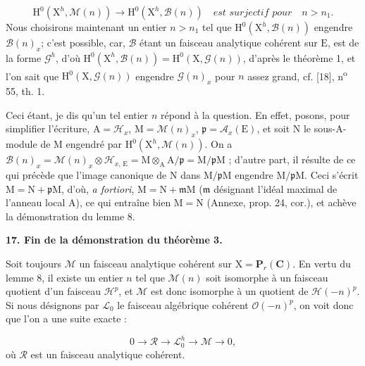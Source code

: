 \begin{equation}\tag{9}
\mathrm{H}^0(\mathrm{X}^h, \mathcal{M}(n)) \to \mathrm{H}^0(\mathrm{X}^h, \mathcal{B}(n)) \quad \textit{est surjectif pour} \quad n > n_1.
\end{equation}
Nous choisirons maintenant un entier $n > n_1$ tel que $\mathrm{H}^0(\mathrm{X}^h, \mathcal{B}(n))$ engendre $\mathcal{B}(n)_x$; c'est possible, car, $\mathcal{B}$ étant un faisceau analytique cohérent sur $\mathrm{E}$, est de la forme $\mathcal{G}^h$, d'où $\mathrm{H}^0(\mathrm{X}^h, \mathcal{B}(n)) = \mathrm{H}^0(\mathrm{X}, \mathcal{G}(n))$, d'après le théorème 1, et l'on sait que $\mathrm{H}^0(\mathrm{X}, \mathcal{G}(n))$ engendre $\mathcal{G}(n)_x$ pour $n$ assez grand, cf. [18], n\textsuperscript{o} 55, th. 1.

Ceci étant, je dis qu'un tel entier $n$ répond à la question.
%
%
En effet, posons, pour simplifier l'écriture, $\mathrm{A} = \mathcal{H}_x$, $\mathrm{M} = \mathcal{M}(n)_x$, $\mathfrak{p} = \mathcal{A}_x(\mathrm{E})$, et soit $\mathrm{N}$ le sous-$\mathrm{A}$-module de $\mathrm{M}$ engendré par $\mathrm{H}^0(\mathrm{X}^h, \mathcal{M}(n))$. On a $\mathcal{B}(n)_x = \mathcal{M}(n)_x \otimes \mathcal{H}_{x,\,\mathrm{E}} = \mathrm{M} \otimes_{\mathrm{A}} \mathrm{A}/\mathfrak{p} = \mathrm{M}/\mathfrak{p}\mathrm{M}$ ; d'autre part, il résulte de ce qui précède que l'image canonique de $\mathrm{N}$ dans $\mathrm{M}/\mathfrak{p}\mathrm{M}$ engendre $\mathrm{M}/\mathfrak{p}\mathrm{M}$. Ceci s'écrit $\mathrm{M} = \mathrm{N} + \mathfrak{p}\mathrm{M}$, d'où, \textit{a fortiori}, $\mathrm{M} = \mathrm{N} + \mathfrak{m}\mathrm{M}$ ($\mathfrak{m}$ désignant l'idéal maximal de l'anneau local $\mathrm{A}$), ce qui entraîne bien $\mathrm{M} = \mathrm{N}$ (Annexe, prop. 24, cor.), et achève la démonstration du lemme 8.


\textbf{17. Fin de la démonstration du théorème 3.}

Soit toujours $\mathcal{M}$ un faisceau analytique cohérent sur $\mathrm{X} = \mathbf{P}_r(\mathbf{C})$. En vertu du lemme 8, il existe un entier $n$ tel que $\mathcal{M}(n)$ soit isomorphe à un faisceau quotient d'un faisceau $\mathcal{H}^p$, et $\mathcal{M}$ est donc isomorphe à un quotient de $\mathcal{H}(-n)^p$. Si nous désignons par $\mathcal{L}_0$ le faisceau algébrique cohérent $\mathcal{O}(-n)^p$, on voit donc que l'on a une suite exacte :

\begin{equation*}
0 \to \mathcal{R} \to \mathcal{L}_0^h \to \mathcal{M} \to 0,
\end{equation*}
où $\mathcal{R}$ est un faisceau analytique cohérent.

